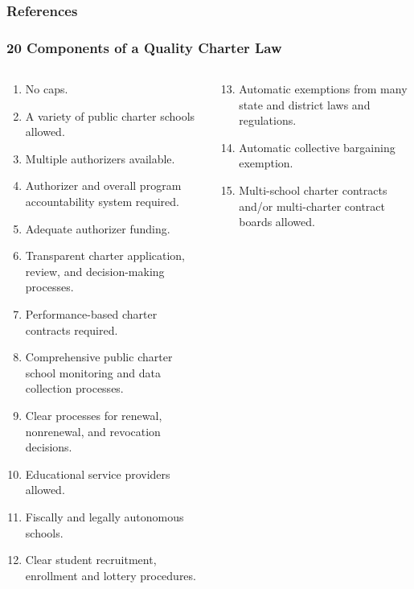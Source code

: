 \documentclass[10pt,handout,mathserif]{beamer}
\begin{document}
\begin{frame}[c,shrink=30]
    \nocite{HelmreichPruzek2009,PruzekHelmreich2009}
	\frametitle{References}
	
	
\end{frame}


\begin{frame}
    \frametitle{20 Components of a Quality Charter Law}
    {\footnotesize
    \begin{columns}
        \begin{column}{0.5\textwidth}
            \begin{enumerate}
            \item No caps.
            \item A variety of public charter schools allowed.
            \item Multiple authorizers available.
            \item Authorizer and overall program accountability system required.
            \item Adequate authorizer funding.
            \item Transparent charter application, review, and decision-making processes.
            \item Performance-based charter contracts required.
            \item Comprehensive public charter school monitoring and data collection processes.
            \item Clear processes for renewal, nonrenewal, and revocation decisions.
            \item Educational service providers allowed.
            \item Fiscally and legally autonomous schools.
            \item Clear student recruitment, enrollment and lottery procedures.
            \end{enumerate}
        \end{column}
        \begin{column}{0.5\textwidth}
            \begin{enumerate}
            \setcounter{enumi}{12}
            \item Automatic exemptions from many state and district laws and regulations.
            \item Automatic collective bargaining exemption.
            \item Multi-school charter contracts and/or multi-charter contract boards allowed.

\end{enumerate}
\end{column}
\end{columns}}
\end{frame}
\end{document}

